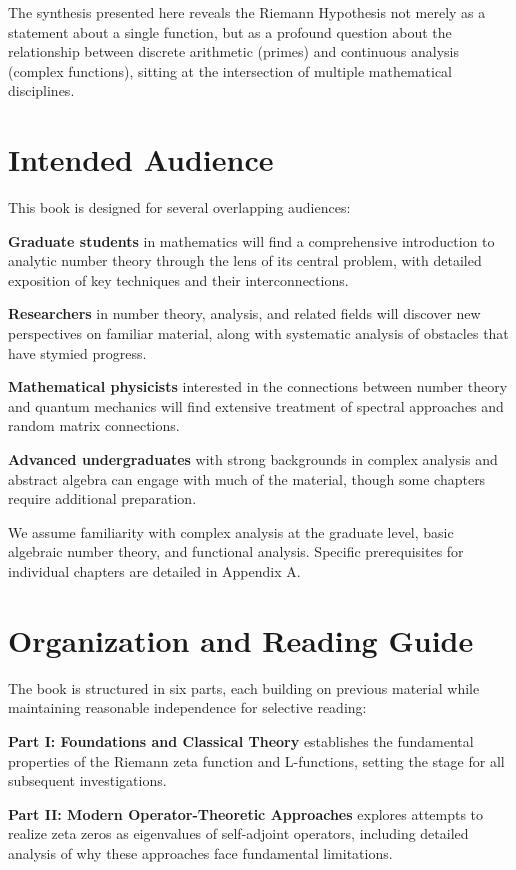 The synthesis presented here reveals the Riemann Hypothesis not merely as a statement about a single function, but as a profound question about the relationship between discrete arithmetic (primes) and continuous analysis (complex functions), sitting at the intersection of multiple mathematical disciplines.

\section*{Intended Audience}

This book is designed for several overlapping audiences:

\textbf{Graduate students} in mathematics will find a comprehensive introduction to analytic number theory through the lens of its central problem, with detailed exposition of key techniques and their interconnections.

\textbf{Researchers} in number theory, analysis, and related fields will discover new perspectives on familiar material, along with systematic analysis of obstacles that have stymied progress.

\textbf{Mathematical physicists} interested in the connections between number theory and quantum mechanics will find extensive treatment of spectral approaches and random matrix connections.

\textbf{Advanced undergraduates} with strong backgrounds in complex analysis and abstract algebra can engage with much of the material, though some chapters require additional preparation.

We assume familiarity with complex analysis at the graduate level, basic algebraic number theory, and functional analysis. Specific prerequisites for individual chapters are detailed in Appendix A.

\section*{Organization and Reading Guide}

The book is structured in six parts, each building on previous material while maintaining reasonable independence for selective reading:

\textbf{Part I: Foundations and Classical Theory} establishes the fundamental properties of the Riemann zeta function and L-functions, setting the stage for all subsequent investigations.

\textbf{Part II: Modern Operator-Theoretic Approaches} explores attempts to realize zeta zeros as eigenvalues of self-adjoint operators, including detailed analysis of why these approaches face fundamental limitations.

